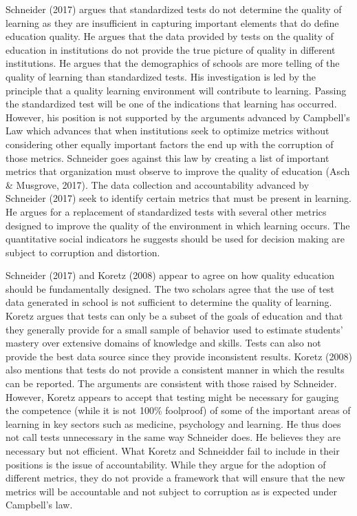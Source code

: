 \documentclass[11pt]{article}
\begin{document}
Schneider (2017) argues that standardized tests do not determine the quality of learning as they are insufficient in capturing important elements that do define education quality. He argues that the data provided by tests on the quality of education in institutions do not provide the true picture of quality in different institutions. He argues that the demographics of schools are more telling of the quality of learning than standardized tests. His investigation is led by the principle that a quality learning environment will contribute to learning. Passing the standardized test will be one of the indications that learning has occurred. However, his position is not supported by the arguments advanced by Campbell's Law which advances that when institutions seek to optimize metrics without considering other equally important factors the end up with the corruption of those metrics. Schneider goes against this law by creating a list of important metrics that organization must observe to improve the quality of education (Asch \& Musgrove, 2017). The data collection and accountability advanced by Schneider (2017) seek to identify certain metrics that must be present in learning. He argues for a replacement of standardized tests with several other metrics designed to improve the quality of the environment in which learning occurs. The quantitative social indicators he suggests should be used for decision making are subject to corruption and distortion.

Schneider (2017) and Koretz (2008) appear to agree on how quality education should be fundamentally designed. The two scholars agree that the use of test data generated in school is not sufficient to determine the quality of learning. Koretz argues that tests can only be a subset of the goals of education and that they generally provide for a small sample of behavior used to estimate students' mastery over extensive domains of knowledge and skills. Tests can also not provide the best data source since they provide inconsistent results. Koretz (2008) also mentions that tests do not provide a consistent manner in which the results can be reported. The arguments are consistent with those raised by Schneider. However, Koretz appears to accept that testing might be necessary for gauging the competence (while it is not 100\% foolproof) of some of the important areas of learning in key sectors such as medicine, psychology and learning. He thus does not call tests unnecessary in the same way Schneider does. He believes they are necessary but not efficient. What Koretz and Schneidder fail to include in their positions is the issue of accountability. While they argue for the adoption of different metrics, they do not provide a framework that will ensure that the new metrics will be accountable and not subject to corruption as is expected under Campbell’s law.
\end{document}
